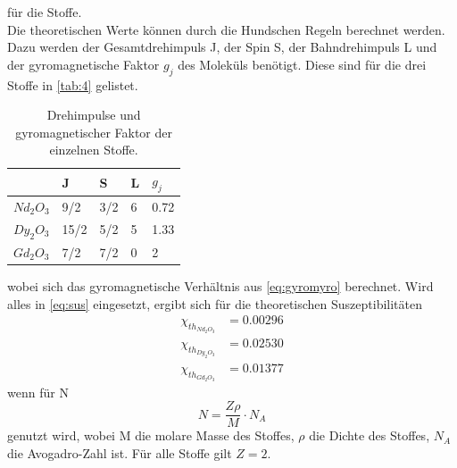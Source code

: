 für die Stoffe.\\
Die theoretischen Werte können durch die Hundschen Regeln berechnet werden. Dazu werden der Gesamtdrehimpuls J, der Spin S, der Bahndrehimpuls L und der gyromagnetische Faktor $g_j$ des Moleküls benötigt. Diese sind für die drei Stoffe in \autoref{tab:4} gelistet.
\begin{table}[H]
  \centering
  \caption{Drehimpulse und gyromagnetischer Faktor der einzelnen Stoffe.}
  \begin{tabular}{l|l|l|l|l}
   & J & S & L & $g_j$\\ \hline
   $Nd_2 O_3$ & 9/2 & 3/2 & 6 & 0.72\\ \hline
   $Dy_2 O_3$ & 15/2 & 5/2 & 5 & 1.33\\ \hline
   $Gd_2 O_3$ & 7/2 & 7/2 & 0 & 2\\ \hline
   \end{tabular}
   \label{tab:4}
\end{table}
wobei sich das gyromagnetische Verhältnis aus \autoref{eq:gyromyro} berechnet. 
Wird alles in \autoref{eq:sus} eingesetzt, ergibt sich für die theoretischen Suszeptibilitäten
\begin{align*}
  \chi_{th_{Nd_2 O_3}}&=0.00296\\
  \chi_{th_{Dy_2 O_3}}&=0.02530\\
  \chi_{th_{Gd_2 O_3}}&=0.01377
\end{align*}
wenn für N %
\begin{equation*}
  N=\frac{Z\rho}{M}\cdot N_{A}
\end{equation*}
genutzt wird, wobei M die molare Masse des Stoffes, $\rho$ die Dichte des Stoffes, $N_A$ die Avogadro-Zahl ist. Für alle Stoffe gilt $Z=2$.
